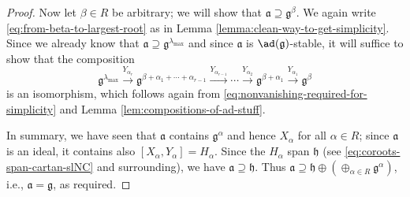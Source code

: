 \documentclass[reqno]{amsart} 
\begin{document}
\begin{proof}
  Now let $\beta \in R$ be arbitrary; we will show that $\mathfrak{a} \supseteq \mathfrak{g}^\beta$.  We again write \eqref{eq:from-beta-to-largest-root} as in Lemma \ref{lemma:clean-way-to-get-simplicity}.  Since we already know that $\mathfrak{a} \supseteq \mathfrak{g}^{\lambda_{\max}}$ and since $\mathfrak{a}$ is $\ad(\mathfrak{g})$-stable, it will suffice to show that the composition
  \begin{equation}
    \mathfrak{g}^{\lambda_{\max}}
    \xrightarrow{Y_{\alpha_r}}
    \mathfrak{g}^{\beta+\alpha_1+\dotsb+\alpha_{r-1}}
    \xrightarrow{Y_{\alpha_{r-1}}}
    \dotsb
    \xrightarrow{Y_{\alpha_2}}
    \mathfrak{g}^{\beta+\alpha_1}
    \xrightarrow{Y_{\alpha_1}}
    \mathfrak{g}^\beta
  \end{equation}
  is an isomorphism, which follows again from \eqref{eq:nonvanishing-required-for-simplicity} and Lemma \ref{lem:compositions-of-ad-stuff}.



  In summary, we have seen that $\mathfrak{a}$ contains $\mathfrak{g}^\alpha$ and hence $X_\alpha$ for all $\alpha \in R$; since $\mathfrak{a}$ is an ideal, it contains also $[X_\alpha,Y_\alpha] = H_\alpha$.  Since the $H_\alpha$ span $\mathfrak{h}$ (see \eqref{eq:coroots-span-cartan-slNC} and surrounding), we have $\mathfrak{a} \supseteq \mathfrak{h}$.  Thus $\mathfrak{a} \supseteq \mathfrak{h} \oplus (\oplus_{\alpha \in R} \mathfrak{g}^\alpha)$, i.e., $\mathfrak{a} =\mathfrak{g}$, as required.
\end{proof}
\end{document}
